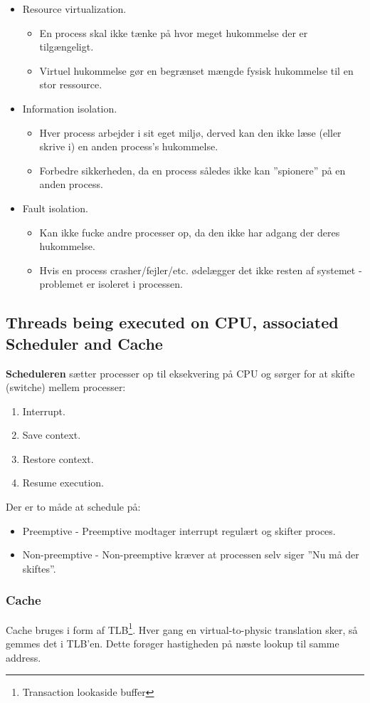 \begin{itemize}
	\item Resource virtualization.
	\begin{itemize}
		\item En process skal ikke tænke på hvor meget hukommelse der er tilgængeligt.
		\item Virtuel hukommelse gør en begrænset mængde fysisk hukommelse til en stor ressource.
	\end{itemize}
	\item Information isolation.
	\begin{itemize}
		\item Hver process arbejder i sit eget miljø, derved kan den ikke læse (eller skrive i) en anden process's hukommelse.
		\item Forbedre sikkerheden, da en process således ikke kan ''spionere'' på en anden process.
	\end{itemize}
	\item Fault isolation.
	\begin{itemize}
		\item Kan ikke fucke andre processer op, da den ikke har adgang der deres hukommelse.
		\item Hvis en process crasher/fejler/etc. ødelægger det ikke resten af systemet - problemet er isoleret i processen.
	\end{itemize}
\end{itemize}

\subsection{Threads being executed on CPU, associated Scheduler and Cache}
\textbf{Scheduleren} sætter processer op til eksekvering på CPU og sørger for at skifte (switche) mellem processer:

\begin{enumerate}
	\item Interrupt.
	\item Save context.
	\item Restore context.
	\item Resume execution.
\end{enumerate}

Der er to måde at schedule på:

\begin{itemize}
	\item Preemptive - Preemptive modtager interrupt regulært og skifter proces.
	\item Non-preemptive - Non-preemptive kræver at processen selv siger ''Nu må der skiftes''.
\end{itemize}

\subsubsection{Cache}
Cache bruges i form af TLB\footnote{Transaction lookaside buffer}.
Hver gang en virtual-to-physic translation sker, så gemmes det i TLB’en. Dette forøger hastigheden på næste lookup til samme address.